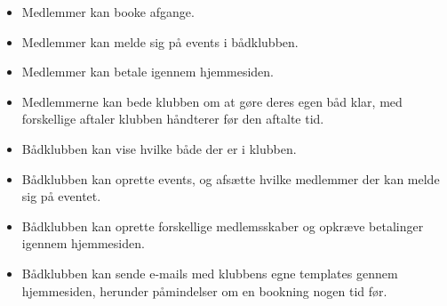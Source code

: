 \begin{itemize}
	\item Medlemmer kan booke afgange.
	\item Medlemmer kan melde sig på events i bådklubben.
	\item Medlemmer kan betale igennem hjemmesiden.
	\item Medlemmerne kan bede klubben om at gøre deres egen båd klar, med forskellige aftaler klubben håndterer før den aftalte tid.
	\item Bådklubben kan vise hvilke både der er i klubben.
	\item Bådklubben kan oprette events, og afsætte hvilke medlemmer der kan melde sig på eventet.
	\item Bådklubben kan oprette forskellige medlemsskaber og opkræve betalinger igennem hjemmesiden.
	\item Bådklubben kan sende e-mails med klubbens egne templates gennem hjemmesiden, herunder påmindelser om en bookning nogen tid før.
\end{itemize}

